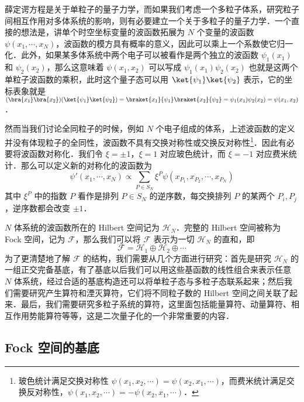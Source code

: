 

薛定谔方程是关于单粒子的量子力学，而如果我们考虑一个多粒子体系，研究粒子间相互作用对多体系统的影响，则有必要建立一个关于多粒子的量子力学．一个直接的想法是，讲单个时空坐标变量的波函数拓展为 $N$ 个变量的波函数 $\psi(x_1,\cdots,x_N)$，波函数的模方具有概率的意义，因此可以乘上一个系数使它归一化．此外，如果某多体系统中两个电子可以被看作是两个独立的波函数 $\psi_1(x_1)$ 和 $\psi_2(x_2)$，那么这意味着 $\psi(x_1,x_2)$ 可以写成 $\psi_1(x_1)\psi_2(x_2)$ 也就是这两个单粒子波函数的乘积，此时这个量子态可以用 $\ket{\psi_1}\ket{\psi_2}$ 表示，它的坐标表象就是 $(\bra{x_1}\bra{x_2})(\ket{\psi_1}\ket{\psi_2})=\braket{x_1}{\psi_1} \braket{x_2}{\psi_2}=\psi_1(x_1)\psi_2(x_2)=\psi(x_1,x_2)$．

然而当我们讨论全同粒子的时候，例如 $N$ 个电子组成的体系，上述波函数的定义并没有体现粒子的全同性，波函数不具有交换对称性或交换反对称性\footnote{玻色统计满足交换对称性 $\psi(x_1,x_2,\cdots)=\psi(x_2,x_1,\cdots)$，而费米统计满足交换反对称性，$\psi(x_1,x_2,\cdots)=-\psi(x_2,x_1,\cdots)$．}．因此有必要将波函数对称化．我们令 $\xi=\pm 1$，$\xi=1$ 对应玻色统计，而 $\xi=-1$ 对应费米统计．那么可以定义新的对称化的波函数为
\begin{equation}
\psi'(x_1,\cdots,x_N)\propto \sum_{P\in S_N} \xi^P \psi(x_{P_1},x_{P_2},\cdots,x_{P_N})
\end{equation}
其中 $\xi^P$ 中的指数 $P$ 看作是排列 $P\in S_N$ 的逆序数，每交换排列 $P$ 的某两个 $P_i,P_j$，逆序数都会改变 $\pm 1$．

$N$ 体系统的波函数所在的 Hilbert 空间记为 $\mathcal{H}_N$．完整的 Hilbert 空间被称为 Fock 空间，记为 $\mathcal{F}$，那么我们可以将 $\mathcal{F}$ 表示为一切 $\mathcal{H}_N$ 的直和，即
\begin{equation}
\mathcal{F}=\mathcal{H}_1 \oplus \mathcal{H}_2 \oplus \cdots
\end{equation}
为了更清楚地了解 $\mathcal{F}$ 的结构，我们需要从几个方面进行研究：首先是研究 $\mathcal{H}_N$ 的一组正交完备基底，有了基底以后我们可以用这些基函数的线性组合来表示任意 $N$ 体系统，经过合适的基底构造还可以将单粒子态与多粒子态联系起来；然后我们需要研究产生算符和湮灭算符，它们将不同粒子数的 Hilbert 空间之间关联了起来．最后，我们需要研究多粒子系统的算符，这里面包括能量算符、动量算符、相互作用势能算符等等，这是二次量子化的一个非常重要的内容．
\subsection{Fock 空间的基底}
